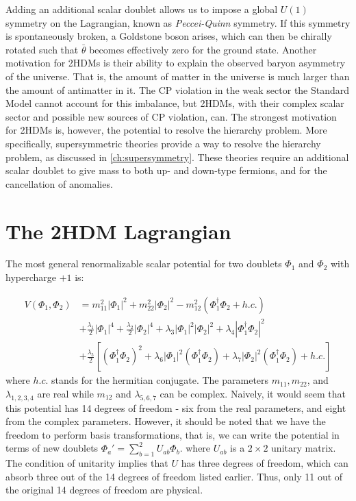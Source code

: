 Adding an additional scalar doublet allows us to impose a global $U(1)$ symmetry on the Lagrangian, known as \emph{Peccei-Quinn} symmetry. If this symmetry is spontaneously broken, a Goldstone boson arises, which can then be chirally rotated such that $\bar{\theta}$ becomes effectively zero for the ground state.
Another motivation for 2HDMs is their ability to explain the observed baryon asymmetry of the universe. That is, the amount of matter in the universe is much larger than the amount of antimatter in it. The CP violation in the weak sector the Standard Model cannot account for this imbalance, but 2HDMs, with their complex scalar sector and possible new sources of CP violation, can.
%
The strongest motivation for 2HDMs is, however, the potential to resolve the hierarchy problem. More specifically, supersymmetric theories provide a way to resolve the hierarchy problem, as discussed in \autoref{ch:supersymmetry}. These theories require an additional scalar doublet to give mass to both up- and down-type fermions, and for the cancellation of anomalies.

\section{The 2HDM Lagrangian}
The most general renormalizable scalar potential for two doublets $\Phi_1$ and $\Phi_2$ with hypercharge $+1$ is:

\begin{align*}
  V(\Phi_1,\Phi_2) &= m_{11}^2|\Phi_1|^2 + m_{22}^2|\Phi_2|^2 - m_{12}^2\left(\Phi_1^\dagger\Phi_2 + h.c.\right)\\
&+\frac{\lambda_1}{2}|\Phi_1|^4 + \frac{\lambda_2}{2}|\Phi_2|^4+\lambda_3|\Phi_1|^2|\Phi_2|^2 + \lambda_4|\Phi_1^\dagger\Phi_2|^2\\
&+\frac{\lambda_5}{2}\left[\left(\Phi_1^\dagger\Phi_2 \right)^2+\lambda_6|\Phi_1|^2(\Phi_1^\dagger\Phi_2)+\lambda_7|\Phi_2|^2(\Phi_1^\dagger\Phi_2) + h.c.\right]
\label{eq:2HDM_scalar_potential}
\end{align*}
where $h.c.$ stands for the hermitian conjugate. The parameters $m_{11}, m_{22}$, and $\lambda_{1,2,3,4}$ are real while $m_{12}$ and $\lambda_{5,6,7}$ can be complex. Naively, it would seem that this potential has 14 degrees of freedom - six from the real parameters, and eight from the complex parameters. However, it should be noted that we have the freedom to perform basis transformations, that is, we can write the potential in terms of new doublets $\Phi_a' = \sum_{b=1}^2U_{ab}\Phi_b$. where $U_{ab}$ is a $2\times 2$ unitary matrix. The condition of unitarity implies that $U$ has three degrees of freedom, which can absorb three out of the 14 degrees of freedom listed earlier. Thus, only 11 out of the original 14 degrees of freedom are physical.

